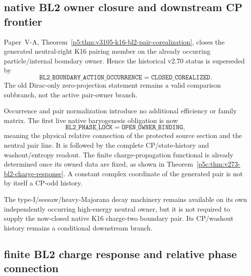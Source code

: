 \documentclass[12pt,a4paper]{article}
\begin{document}
\subsection{native BL2 owner closure and downstream CP frontier}
\label{p5c:sec:v272-bl2-owner-closure}

\begin{proposition}
\label{p5c:prop:v272-bl2-owner-corealized}
Paper~V-A,
Theorem~\ref{p5:thm:v3105-k16-bl2-pair-corealization}, closes the generated
neutral-right K16 pairing member on the already occurring particle/internal
boundary owner.  Hence the historical v2.70 status is superseded by
\[
 \boxed{
 \texttt{BL2\_BOUNDARY\_ACTION\_OCCURRENCE}
 =\texttt{CLOSED\_COREALIZED}.}
\]
The old Dirac-only zero-projection statement remains a valid comparison
subbranch, not the active pair-owner branch.
\end{proposition}

\begin{corollary}
\label{p5c:cor:v272-native-baryogenesis-phase-frontier}
Occurrence and pair normalization introduce no additional efficiency or
family matrix.  The first live native baryogenesis obligation is now
\[
 \boxed{
 \texttt{BL2\_PHASE\_LOCK}=\texttt{OPEN\_OWNER\_BINDING},}
\]
meaning the physical relative connection of the protected source section and
the neutral pair line.  It is followed by the complete CP/state-history and
washout/entropy readout.  The finite charge-propagation functional is already
determined once its owned data are fixed, as shown in
Theorem~\ref{p5c:thm:v273-bl2-charge-response}.  A constant complex coordinate
of the generated pair is not by itself a CP-odd history.
\end{corollary}

\begin{remark}
\label{p5c:rem:v272-heavy-neutral-still-conditional}
The type-I/seesaw/heavy-Majorana decay machinery remains available on its own
independently occurring high-energy neutral owner, but it is not required to
supply the now-closed native K16 charge-two boundary pair.  Its CP/washout
history remains a conditional downstream branch.
\end{remark}


\subsection{finite BL2 charge response and relative phase connection}
\label{p5c:sec:v273-bl2-charge-response}
\end{document}
